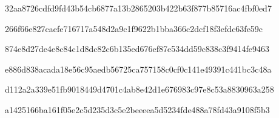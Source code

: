 \par\noindent\begin{minipage}{\linewidth}
\par
{\footnotesize\ttfamily 32aa8726cdfd9fd43b54cb6877a13b2865203b422b63f877b85716ac4fbf0ed7}\par
\end{minipage}\par\smallskip
\par\noindent\begin{minipage}{\linewidth}
\par
{\footnotesize\ttfamily 266f66e827caefe716717a548d2a9c1f9622b1bba366c2dcf18f3efdc63fe59c}\par
\end{minipage}\par\smallskip
\par\noindent\begin{minipage}{\linewidth}
\par
{\footnotesize\ttfamily 874e8d27de4e8c84c1d8dc82c6b135ed676ef87e534dd59c838c3f9414fe9463}\par
\end{minipage}\par\smallskip
\par\noindent\begin{minipage}{\linewidth}
\par
{\footnotesize\ttfamily e886d838acada18e56c95aedb56725ca757158c0cf0c141e49391c441bc3c48a}\par
\end{minipage}\par\smallskip
\par\noindent\begin{minipage}{\linewidth}
\par
{\footnotesize\ttfamily d112a2a339e51fb9018449d4701c4ab8e42d1e676983c97e8c53a8830963a258}\par
\end{minipage}\par\smallskip
\par\noindent\begin{minipage}{\linewidth}
\par
{\footnotesize\ttfamily a1425166ba161f05e2c5d235d3c5e2beeeea5d5234fde488a78fd43a9108f5b3}\par
\end{minipage}\par\smallskip
